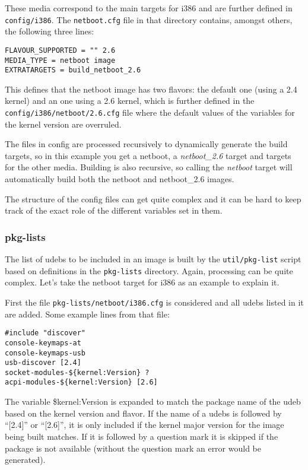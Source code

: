 \documentclass[a4paper,10pt]{article}
\begin{document}
These media correspond to the main targets for i386 and are further defined in \texttt{config/i386}. The \texttt{netboot.cfg} file in that directory contains, amongst others, the following three lines: 

\begin{verbatim}
FLAVOUR_SUPPORTED = "" 2.6
MEDIA_TYPE = netboot image
EXTRATARGETS = build_netboot_2.6
\end{verbatim}

This defines that the netboot image has two flavors: the default one (using a 2.4 kernel) and an one using a 2.6 kernel, which is further defined in the \texttt{config/i386/netboot/2.6.cfg} file where the default values of the variables for the kernel version are overruled. 

The files in config are processed recursively to dynamically generate the build targets, so in this example you get a netboot, a \textit{netboot\_2.6} target and targets for the other media. Building is also recursive, so calling the \textit{netboot} target will automatically build both the netboot and netboot\_2.6 images. 

The structure of the config files can get quite complex and it can be hard to keep track of the exact role of the different variables set in them. 

\subsubsection*{pkg-lists}
The list of udebs to be included in an image is built by the \texttt{util/pkg-list} script based on definitions in the \texttt{pkg-lists} directory. Again, processing can be quite complex. Let's take the netboot target for i386 as an example to explain it. 

First the file \texttt{pkg-lists/netboot/i386.cfg} is considered and all udebs listed in it are added. Some example lines from that file:

\begin{verbatim}
#include "discover"
console-keymaps-at
console-keymaps-usb
usb-discover [2.4]
socket-modules-${kernel:Version} ?
acpi-modules-${kernel:Version} [2.6]
\end{verbatim}

The variable \${kernel:Version} is expanded to match the package name of the udeb based on the kernel version and flavor. If the name of a udebs is followed by “[2.4]” or “[2.6]”, it is only included if the kernel major version for the image being built matches. If it is followed by a question mark it is skipped if the package is not available (without the question mark an error would be generated). 
\end{document}
